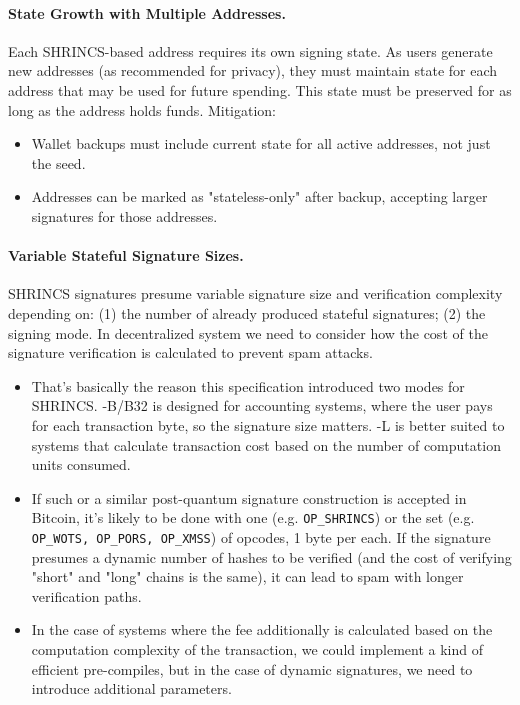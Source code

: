\paragraph{State Growth with Multiple Addresses.}
Each SHRINCS-based address requires its own signing state. As users generate new addresses (as recommended for privacy), they must maintain state for each address that may be used for future spending. This state must be preserved for as long as the address holds funds. Mitigation:
\begin{itemize}
    \item Wallet backups must include current state for all active addresses, not just the seed.
    \item Addresses can be marked as "stateless-only" after backup, accepting larger signatures for those addresses.
\end{itemize}

\paragraph{Variable Stateful Signature Sizes.}
SHRINCS signatures presume variable signature size and verification complexity depending on: (1) the number of already produced stateful signatures; (2) the signing mode. In decentralized system we need to consider how the cost of the signature verification is calculated to prevent spam attacks.
\begin{itemize}
    \item That's basically the reason this specification introduced two modes for SHRINCS. -B/B32 is designed for accounting systems, where the user pays for each transaction byte, so the signature size matters. -L is better suited to systems that calculate transaction cost based on the number of computation units consumed. 
    \item If such or a similar post-quantum signature construction is accepted in Bitcoin, it's likely to be done with one (e.g. \texttt{OP\_SHRINCS}) or the set (e.g. \texttt{OP\_WOTS, OP\_PORS, OP\_XMSS}) of opcodes, 1 byte per each. If the signature presumes a dynamic number of hashes to be verified (and the cost of verifying "short" and "long" chains is the same), it can lead to spam with longer verification paths. 
    \item In the case of systems where the fee additionally is calculated based on the computation complexity of the transaction, we could implement a kind of efficient pre-compiles, but in the case of dynamic signatures, we need to introduce additional parameters. 
\end{itemize}